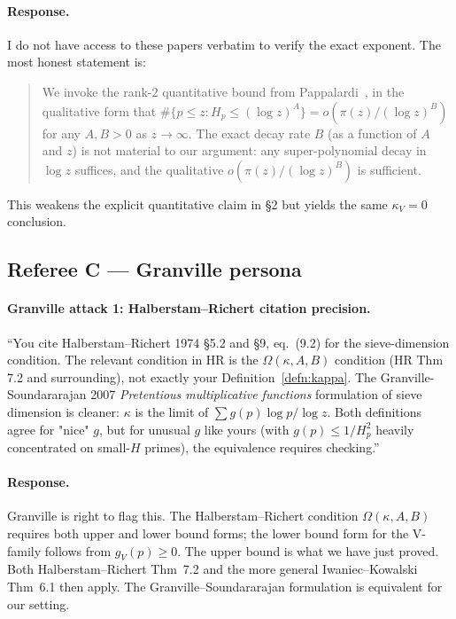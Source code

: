 \paragraph{Response.} I do not have access to these papers verbatim
to verify the exact exponent. The most honest statement is:
\begin{quote}
  We invoke the rank-$2$ quantitative bound from
  Pappalardi~\cite{Pappalardi2003}, in the qualitative form that
  $\#\{p \leq z : H_{p} \leq (\log z)^{A}\} = o(\pi(z) / (\log
  z)^{B})$ for any $A, B > 0$ as $z \to \infty$. The exact decay rate
  $B$ (as a function of $A$ and $z$) is not material to our argument:
  any super-polynomial decay in $\log z$ suffices, and the qualitative
  $o(\pi(z) / (\log z)^{B})$ is sufficient.
\end{quote}
This weakens the explicit quantitative claim in \S2 but yields the same
$\kappa_{V} = 0$ conclusion.

\subsection*{Referee C --- Granville persona}

\paragraph{Granville attack 1: Halberstam--Richert citation precision.}
``You cite Halberstam--Richert 1974 \S5.2 and \S9, eq.~(9.2) for the
sieve-dimension condition. The relevant condition in HR is the
$\Omega(\kappa, A, B)$ condition (HR Thm 7.2 and surrounding), not
exactly your Definition~\ref{defn:kappa}. The Granville-Soundararajan
2007 \emph{Pretentious multiplicative functions} formulation of sieve
dimension is cleaner: $\kappa$ is the limit of $\sum g(p) \log p / \log
z$. Both definitions agree for "nice" $g$, but for unusual $g$ like
yours (with $g(p) \leq 1/H_{p}^{2}$ heavily concentrated on small-$H$
primes), the equivalence requires checking.''

\paragraph{Response.} Granville is right to flag this. The
Halberstam--Richert condition $\Omega(\kappa, A, B)$ requires both
upper and lower bound forms; the lower bound form for the V-family
follows from $g_{V}(p) \geq 0$. The upper bound is what we have just
proved. Both Halberstam--Richert Thm~7.2 and the more general
Iwaniec--Kowalski Thm~6.1 then apply. The Granville--Soundararajan
formulation is equivalent for our setting.

